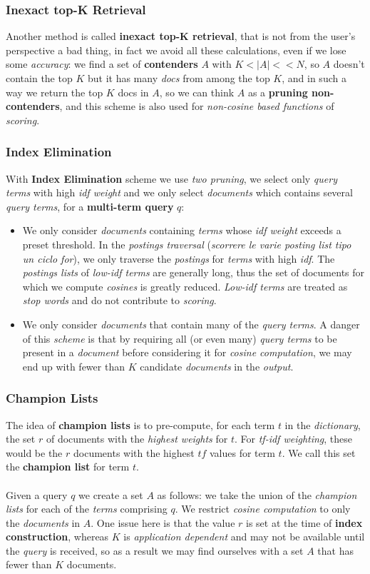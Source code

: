 \documentclass{article}
\begin{document}
\subsubsection{Inexact top-K Retrieval}
Another method is called \textbf{inexact top-K retrieval}, that is not from the user's perspective a bad thing, in fact we avoid all these calculations, even if we lose some \emph{accuracy}: we find a set of \textbf{contenders} $A$ with $K < |A| << N$, so $A$ doesn't contain the top $K$ but it has many \emph{docs} from among the top $K$, and in such a way we return the top $K$ docs in $A$, so we can think $A$ as a \textbf{pruning non-contenders}, and this scheme is also used for\emph{ non-cosine based functions} of \emph{scoring}. 
\subsubsection{Index Elimination}
With \textbf{Index Elimination} scheme we use \emph{two pruning}, we select only \emph{query terms} with high \emph{idf weight} and we only select \emph{documents} which contains several \emph{query terms}, for a \textbf{multi-term query} $q$:
\begin{itemize}
\item We only consider \emph{documents} containing \emph{terms} whose \emph{idf weight} exceeds a preset threshold. In the \emph{postings traversal} (\emph{scorrere le varie posting list tipo un ciclo for}), we only traverse the \emph{postings} for \emph{terms} with high \emph{idf}. The \emph{postings lists} of \emph{low-idf terms} are generally long, thus the set of documents for which we compute \emph{cosines} is greatly reduced.\emph{ Low-idf terms} are treated as \emph{stop words} and do not contribute to \emph{scoring}.
\item We only consider \emph{documents} that contain many of the \emph{query terms}. A danger of this \emph{scheme} is that by requiring all (or even many) \emph{query terms} to be present in a \emph{document} before considering it for \emph{cosine computation}, we may end up with fewer than $K$ candidate \emph{documents} in the \emph{output}.
\end{itemize}
\subsubsection{Champion Lists}
The idea of \textbf{champion lists} is to pre-compute, for each term $t$ in the \emph{dictionary}, the set $r$ of documents with the \emph{highest weights} for $t$. For \emph{tf-idf weighting}, these would be the $r$ documents with the highest $tf$ values for term $t$. We call this set the \textbf{champion list} for term $t$.  \\\\
Given a query $q$ we create a set $A$ as follows: we take the union of the \emph{champion lists} for each of the \emph{terms} comprising $q$. We restrict \emph{cosine computation} to only the \emph{documents} in $A$. One issue here is that the value $r$ is set at the time of \textbf{index construction}, whereas $K$ is \emph{application dependent} and may not be available until the \emph{query} is received, so as a result we may find ourselves with a set $A$ that has fewer than $K$ documents.
\end{document}
